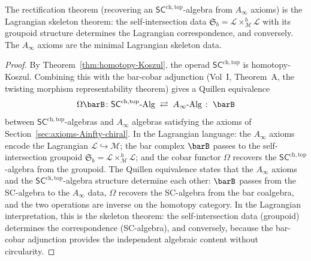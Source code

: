 \begin{proposition}
\label{prop:rectification-lagrangian-skeleton}
The rectification theorem \textup{(}recovering an
$\mathsf{SC}^{\mathrm{ch,top}}$-algebra from $A_\infty$ axioms\textup{)}
is the Lagrangian skeleton theorem: the self-intersection data
$\mathfrak{S}_b = \mathcal{L}\times_{\mathcal{M}}^h\mathcal{L}$
with its groupoid structure determines the Lagrangian correspondence,
and conversely. The $A_\infty$ axioms are the minimal Lagrangian
skeleton data.
\end{proposition}

\begin{proof}
By Theorem~\ref{thm:homotopy-Koszul}, the operad
$\mathsf{SC}^{\mathrm{ch,top}}$ is homotopy-Koszul. Combining this
with the bar-cobar adjunction (Vol~I, Theorem~A, the twisting morphism representability theorem) gives a Quillen
equivalence
\[
 \Omega\barB \colon
 \mathsf{SC}^{\mathrm{ch,top}}\text{-}\mathrm{Alg}
 \;\rightleftarrows\;
 A_\infty\text{-}\mathrm{Alg}
 \;\colon\; \barB
\]
between $\mathsf{SC}^{\mathrm{ch,top}}$-algebras and $A_\infty$
algebras satisfying the axioms of Section~\ref{sec:axioms-Ainfty-chiral}.
In the Lagrangian language: the $A_\infty$ axioms encode the
Lagrangian $\mathcal{L} \hookrightarrow \mathcal{M}$; the bar
complex $\barB$ passes to the self-intersection groupoid
$\mathfrak{S}_b = \mathcal{L}\times_{\mathcal{M}}^h\mathcal{L}$;
and the cobar functor $\Omega$ recovers the
$\mathsf{SC}^{\mathrm{ch,top}}$-algebra from the groupoid. The
Quillen equivalence states that the $A_\infty$ axioms and the
$\mathsf{SC}^{\mathrm{ch,top}}$-algebra structure determine each
other: $\barB$ passes from the SC-algebra to the $A_\infty$ data,
$\Omega$ recovers the SC-algebra from the bar coalgebra, and the
two operations are inverse on the homotopy category. In the
Lagrangian interpretation, this is the skeleton theorem: the
self-intersection data (groupoid) determines the correspondence
(SC-algebra), and conversely, because the bar-cobar adjunction
provides the independent algebraic content without circularity.
\end{proof}

